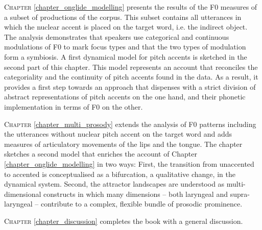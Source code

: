 \textsc{Chapter} \ref{chapter_onglide_modelling} presents the results of the F0 measures of a subset of productions of the corpus. This subset contains all utterances in which the nuclear accent is placed on the target word, i.e. the indirect object. The analysis demonstrates that speakers use categorical and continuous modulations of F0 to mark focus types and that the two types of modulation form a symbiosis. A first dynamical model for pitch accents is sketched in the second part of this chapter. This model represents an account that reconciles the categoriality and the continuity of pitch accents found in the data. As a result, it provides a first step towards an approach that dispenses with a strict division of abstract representations of pitch accents on the one hand, and their phonetic implementation in terms of F0 on the other.

\textsc{Chapter} \ref{chapter_multi_prosody} extends the analysis of F0 patterns including the utterances without nuclear pitch accent on the target word and adds measures of articulatory movements of the lips and the tongue. The chapter  sketches a second model that enriches the account of Chapter \ref{chapter_onglide_modelling} in two ways: First, the transition from unaccented to accented is conceptualised as a bifurcation, a qualitative change, in the dynamical system. Second, the attractor landscapes are understood as multi-dimensional constructs in which many dimensions -- both laryngeal and supra-laryngeal -- contribute to a complex, flexible bundle of prosodic prominence.

\textsc{Chapter} \ref{chapter_discussion} completes the book with a general discussion.

